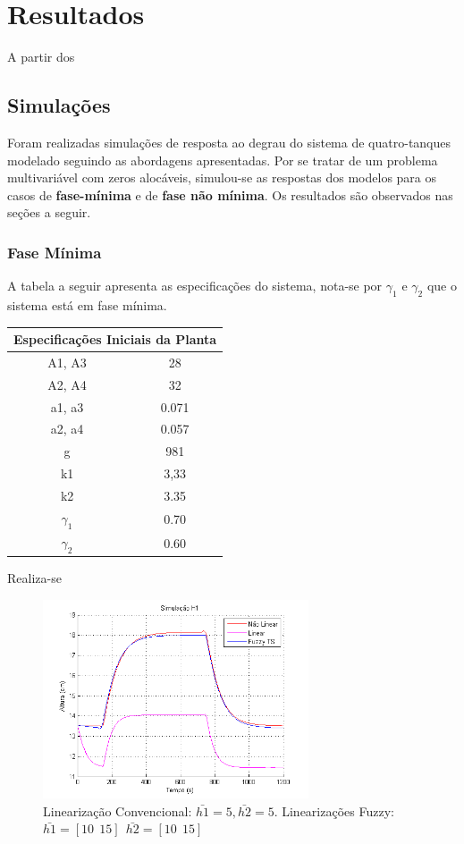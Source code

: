 %

\chapter{Resultados}
\label{capRes}
A partir dos  
\section{Simulações} \label{secAnalise}
Foram realizadas simulações de resposta ao degrau do sistema de quatro-tanques modelado seguindo as abordagens apresentadas. Por se tratar de um problema multivariável com zeros alocáveis, simulou-se as respostas dos modelos para os casos de \textbf{fase-mínima} e de \textbf{fase não mínima}. Os resultados são observados nas seções a seguir.

\subsection{Fase Mínima}
A tabela a seguir apresenta as especificações do sistema, nota-se por $\gamma_1$ e $\gamma_2$ que o sistema está em fase mínima.

\begin{center}
	\begin{tabular}{|c|c|}
		\hline
		\multicolumn{2}{|c|}{Especificações Iniciais da Planta} \\
		\hline
		A1, A3 & 28 \\ \hline
		A2, A4 & 32 \\ \hline
		a1, a3 & 0.071 \\ \hline
		a2, a4 & 0.057 \\ \hline
		g & 981 \\ \hline
		k1 & 3,33 \\ \hline
		k2 & 3.35 \\ \hline
		$\gamma_1$ & 0.70 \\ \hline
		$\gamma_2$ & 0.60 \\ \hline
		\hline
	\end{tabular}
\end{center}

Realiza-se
\begin{figure}[H]
	\centering
	\includegraphics[width=0.7\textwidth]{img/FM_h1_5_10_15.png}
	\caption{\small Linearização Convencional: $ \bar{h1}=5, \bar{h2}=5$. Linearizações Fuzzy: $\bar{h1}=[10 \ \ 15] \ \ \bar{h2}=[10 \ \ 15]$ }
	\label{figH1FM_1}
\end{figure}

